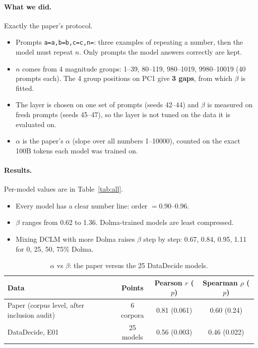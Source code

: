 \documentclass[11pt]{article}
\begin{document}
\paragraph{What we did.} Exactly the paper's protocol.
\begin{itemize}
\item Prompts \texttt{a=a,b=b,c=c,n=}: three examples of repeating a number, then the model must
  repeat $n$. Only prompts the model answers correctly are kept.
\item $n$ comes from 4 magnitude groups: 1--39, 80--119, 980--1019, 9980--10019 (40 prompts each).
  The 4 group positions on PC1 give \textbf{3 gaps}, from which $\beta$ is fitted.
\item The layer is chosen on one set of prompts (seeds 42--44) and $\beta$ is measured on fresh
  prompts (seeds 45--47), so the layer is not tuned on the data it is evaluated on.
\item $\alpha$ is the paper's $\alpha$ (slope over all numbers 1--10000), counted on the exact 100B tokens each model was
  trained on.
\end{itemize}

\paragraph{Results.} Per-model values are in Table~\ref{tab:all}.
\begin{itemize}
\item Every model has a clear number line: order $= 0.90$--$0.96$.
\item $\beta$ ranges from 0.62 to 1.36. Dolma-trained models are least compressed.
\item Mixing DCLM with more Dolma raises $\beta$ step by step: 0.67, 0.84, 0.95, 1.11 for 0, 25, 50,
  75\% Dolma.
\end{itemize}

\begin{table}[h]
\centering\small
\caption{$\alpha$ vs $\beta$: the paper versus the 25 DataDecide models.}
\label{tab:e01}
\begin{tabular}{@{}lccc@{}}
\toprule
Data & Points & Pearson $r$ ($p$) & Spearman $\rho$ ($p$) \\
\midrule
Paper (corpus level, after inclusion audit) & 6 corpora & 0.81 (0.061) & 0.60 (0.24) \\
DataDecide, E01 & 25 models & 0.56 (0.003) & 0.46 (0.022) \\
\bottomrule
\end{tabular}
\end{table}
\end{document}
